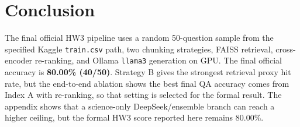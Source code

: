 \documentclass[12pt,a4paper]{article}
\begin{document}
\section{Conclusion}

The final official HW3 pipeline uses a random 50-question sample from the specified Kaggle \texttt{train.csv} path, two chunking strategies, FAISS retrieval, cross-encoder re-ranking, and Ollama \texttt{llama3} generation on GPU. The final official accuracy is \textbf{80.00\% (40/50)}. Strategy B gives the strongest retrieval proxy hit rate, but the end-to-end ablation shows the best final QA accuracy comes from Index A with re-ranking, so that setting is selected for the formal result. The appendix shows that a science-only DeepSeek/ensemble branch can reach a higher ceiling, but the formal HW3 score reported here remains 80.00\%.
\end{document}
